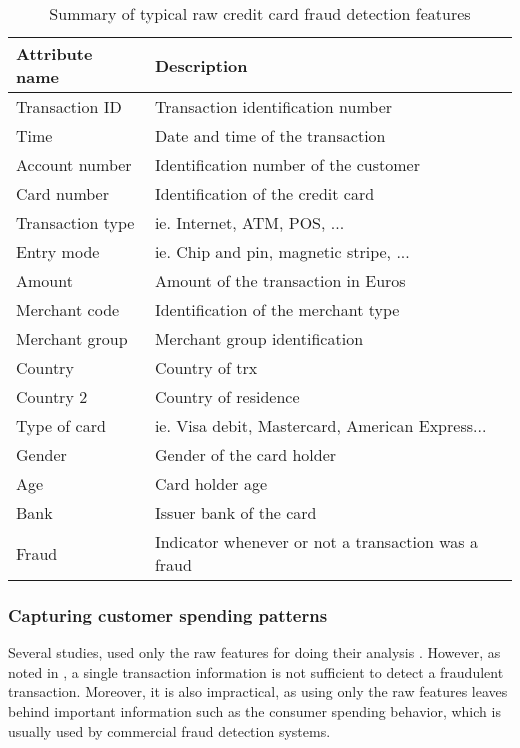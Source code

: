 	\begin{table}[!t]
   \caption{Summary of typical raw credit card fraud detection features}
   \label{tab:raw_features}
   \centering
   \begin{tabular}{l l}
   \hline
   \textbf{Attribute name} & \textbf{Description}\\
   \hline
		Transaction ID & Transaction identification number \\
   Time & Date and time of the transaction\\
   Account number & Identification number of the customer\\
   Card number & Identification of the credit card\\
   Transaction type & ie. Internet, ATM, POS, ...\\
	 Entry mode & ie. Chip and pin, magnetic stripe, ...\\
   Amount & Amount of the transaction in Euros\\
   Merchant code & Identification of the merchant type\\
   Merchant group & Merchant group identification\\
   Country & Country of trx\\
   Country 2 & Country of residence \\
   Type of card & ie. Visa debit, Mastercard, American Express...\\
   Gender & Gender of the card holder\\
   Age & Card holder age\\
   Bank & Issuer bank of the card\\
   Fraud & Indicator whenever or not a transaction was a fraud\\
   \hline
   \end{tabular}
   \end{table}
	
	\subsubsection{Capturing customer spending patterns}
	\label{sec:4:frad:features_agg}
	
	Several studies, used only the raw features for doing their analysis 
	\citep{Brause1999a,Minegishi2011,Panigrahi2009,Sanchez2009}. However, as noted in 
	\citep{Bolton2001}, a single transaction information is not sufficient to detect a fraudulent 
	transaction. Moreover, it is also impractical, as using only the raw features leaves behind 
	important information such as the consumer spending behavior, which is usually used by commercial 
	fraud detection systems.
	
